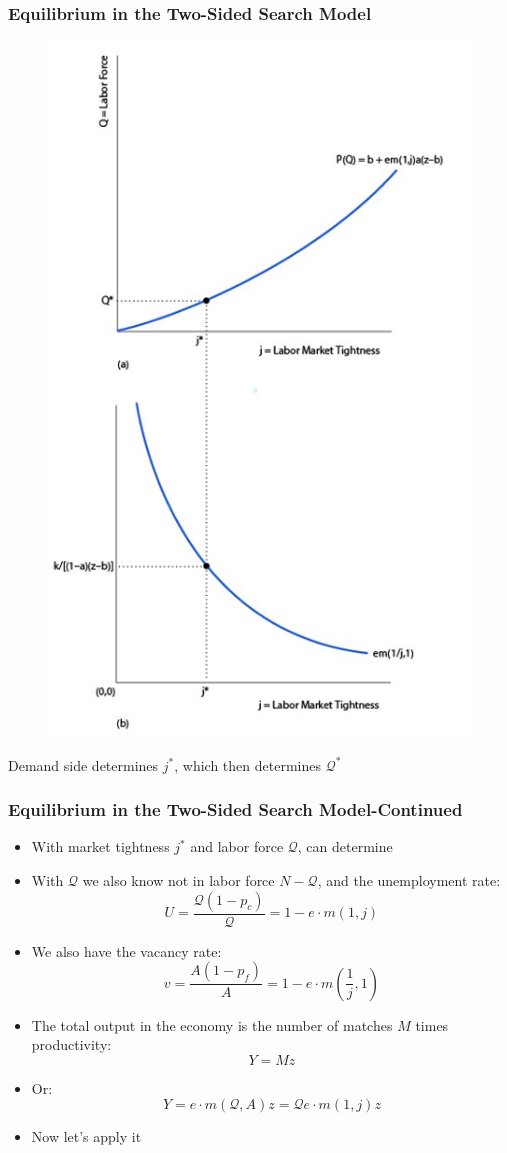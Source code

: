 \documentclass{beamer}
\begin{document}
\begin{frame}
\frametitle[alignment=center]{Equilibrium in the Two-Sided Search Model}
\begin{figure}
\centering
\includegraphics[scale=0.5]{Figures/W_Fig_6pt20.png}
\end{figure}
Demand side determines $j^*$, which then determines $\mathcal{Q}^*$
\end{frame}

\begin{frame}
\frametitle[alignment=center]{Equilibrium in the Two-Sided Search Model-Continued}
\begin{itemize}
\item With market tightness $j^*$ and labor force $\mathcal{Q}$, can determine
\bigskip
\item With $\mathcal{Q}$ we also know not in labor force $N-\mathcal{Q}$, and the unemployment rate:
$$U=\frac{\mathcal{Q}(1-p_c)}{\mathcal{Q}}=1-e\cdot m(1,j)$$
\item We also have the vacancy rate:
$$v=\frac{A(1-p_f)}{A}=1-e\cdot m\left(\frac{1}{j},1\right)$$
\item The total output in the economy is the number of matches $M$ times productivity:
$$Y=Mz$$ 
\item Or:
$$Y=e\cdot m(\mathcal{Q},A)z=\mathcal{Q}e\cdot m(1,j)z$$
\item Now let's apply it
\end{itemize}
\end{frame}
\end{document}
